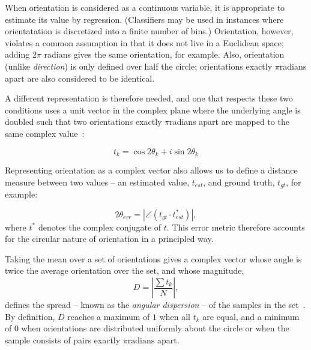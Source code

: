 \label{s:orientation_representation}
%
When orientation is considered as a continuous variable, it is appropriate to estimate its value by regression. (Classifiers may be used in instances where orientatation is discretized into a finite number of bins.) Orientation, however, violates a common assumption in that it does not live in a Euclidean space; adding $2\pi$ radians gives the same orientation, for example. Also, orientation (unlike \emph{direction}) is only defined over half the circle; orientations exactly $\pi$radians apart are also considered to be identical.

A different representation is therefore needed, and one that respects these two conditions uses a unit vector in the complex plane where the underlying angle is doubled such that two orientations exactly $\pi$radians apart are mapped to the same complex value~\cite{Mardia_Jupp_00}:

\begin{equation}
	t_k = \cos 2\theta_k + i\sin 2\theta_k
\end{equation}

Representing orientation as a complex vector also allows us to define a distance measure between two values -- an estimated value, $t_{est}$, and ground truth, $t_{gt}$, for example:

\begin{equation}
	2\theta_{err} = |\angle(t_{gt} \cdot t_{est}^*)|,
\end{equation}
%
\noindent where $t^*$ denotes the complex conjugate of $t$. This error metric therefore accounts for the circular nature of orientation in a principled way.

Taking the mean over a set of orientations gives a complex vector whose angle is twice the average orientation over the set, and whose magnitude,
%
\begin{equation}
D = \left| \frac{\sum{t_k}}{N} \right|,
\label{e:2d}
\end{equation}
%
\noindent defines the spread -- known as the \emph{angular dispersion} -- of the samples in the set~\cite{Mardia_Jupp_00}. By definition, $D$ reaches a maximum of $1$ when all $t_k$ are equal, and a minimum of $0$ when orientations are distributed uniformly about the circle or when the sample consists of pairs exactly $\pi \text{radians}$ apart. 